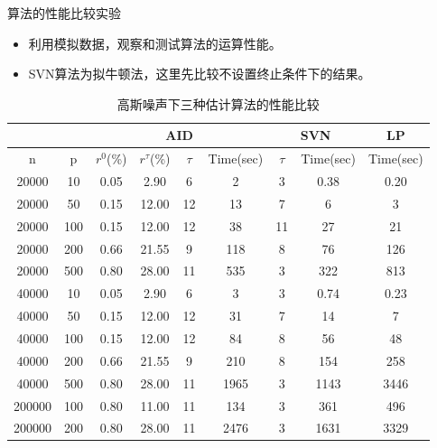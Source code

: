 \begin{frame}{算法的性能比较实验}
    \begin{itemize}
        \item 利用模拟数据，观察和测试算法的运算性能。
        \item SVN算法为拟牛顿法，这里先比较不设置终止条件下的结果。
    \end{itemize}

    \begin{table}[H]
        \tiny
        \caption{\small 高斯噪声下三种估计算法的性能比较}
        \label{tab-performance}
        \centering
        \begin{tabular}{@{}ccccccccc@{}}
        \toprule
               &     & \multicolumn{4}{c}{AID}        & \multicolumn{2}{c}{SVN} & LP        \\ \midrule
        n      & p   & $r^0$(\%) & $r^\tau$(\%) & $\tau$  & Time(sec) & $\tau$      & Time(sec)      & Time(sec) \\ \midrule
        20000  & 10  & 0.05  & 2.90  & 6  & 2         &  3      &         0.38       & 0.20      \\
        20000  & 50 & 0.15  & 12.00 & 12 & 13        &   7     &          6     & 3       \\
        20000  & 100 & 0.15  & 12.00 & 12 & 38        &  11      &         27    & 21         \\
        20000  & 200 & 0.66  & 21.55 & 9  & 118        &   8     &          76      & 126        \\
        20000  & 500 & 0.80  & 28.00 & 11 &  535      &  3      &              322  &     813 \\ 
        40000  & 10  & 0.05  & 2.90  & 6  & 3        &  3      &         0.74      & 0.23     \\
        40000  & 50 & 0.15  & 12.00 & 12 & 31        &   7     &          14     & 7       \\
        40000  & 100 & 0.15  & 12.00 & 12 & 84       &  8      &         56    & 48         \\
        40000  & 200 & 0.66  & 21.55 & 9  & 210        &   8     &          154     & 258        \\
        40000  & 500 & 0.80  & 28.00 & 11 & 1965       &  3      &             1143   &  3446      \\ 
        200000  & 100 & 0.80  & 11.00 & 11 & 134       &  3      &          361      &   496     \\ 
        200000  & 200 & 0.80  & 28.00 & 11 & 2476       &  3      &          1631      &   3329     \\ 
        \bottomrule
        \end{tabular}
    \end{table}
\end{frame}

